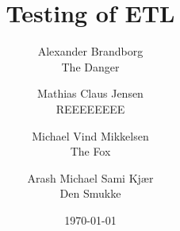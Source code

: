 

\title{Testing of ETL}
\author{Alexander Brandborg
             \\ The Danger
        \and Mathias Claus Jensen
             \\ REEEEEEEE
        \and Michael Vind Mikkelsen
             \\ The Fox
        \and Arash Michael Sami Kjær
             \\ Den Smukke
        }
\date{\today}


\maketitle












